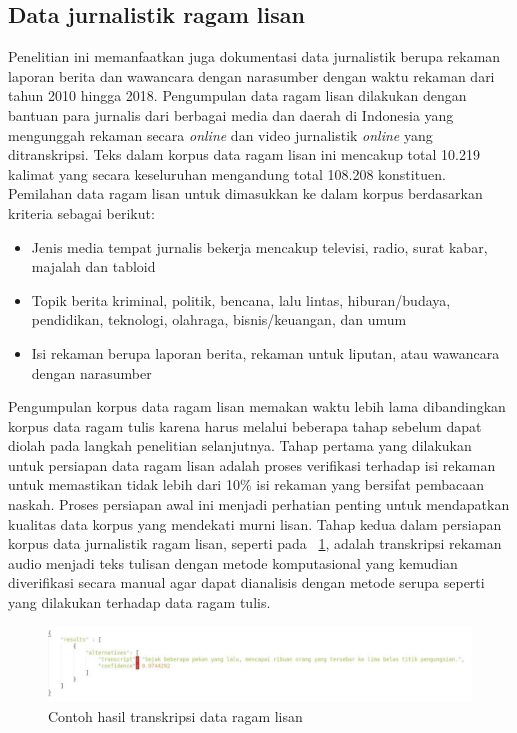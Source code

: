 \subsection{Data jurnalistik ragam lisan}
Penelitian ini memanfaatkan juga dokumentasi data jurnalistik berupa rekaman laporan berita dan wawancara dengan narasumber dengan waktu rekaman dari tahun 2010 hingga 2018. Pengumpulan data ragam lisan dilakukan dengan bantuan para jurnalis dari berbagai media dan daerah di Indonesia yang mengunggah rekaman secara \textit{online} dan video jurnalistik \textit{online} yang ditranskripsi. Teks dalam korpus data ragam lisan ini mencakup total 10.219 kalimat yang secara keseluruhan mengandung total 108.208 konstituen. Pemilahan data ragam lisan untuk dimasukkan ke dalam korpus berdasarkan kriteria sebagai berikut:

\begin{itemize}
	\item Jenis media tempat jurnalis bekerja mencakup televisi, radio, surat kabar, majalah dan tabloid
	\item Topik berita kriminal, politik, bencana, lalu lintas, hiburan/budaya, pendidikan, teknologi, olahraga, bisnis/keuangan, dan umum
	\item Isi rekaman berupa laporan berita, rekaman untuk liputan, atau wawancara dengan narasumber
\end{itemize}

Pengumpulan korpus data ragam lisan memakan waktu lebih lama dibandingkan korpus data ragam tulis karena harus melalui beberapa tahap sebelum dapat diolah pada langkah penelitian selanjutnya. Tahap pertama yang dilakukan untuk persiapan data ragam lisan adalah proses verifikasi terhadap isi rekaman untuk memastikan tidak lebih dari 10\% isi rekaman yang bersifat pembacaan naskah. Proses persiapan awal ini menjadi perhatian penting untuk mendapatkan kualitas data korpus yang mendekati murni lisan. Tahap kedua dalam persiapan korpus data jurnalistik ragam lisan, seperti pada \pic~\ref{fig:contoh-transkripsi-lisan}, adalah transkripsi rekaman audio menjadi teks tulisan dengan metode komputasional yang kemudian diverifikasi secara manual agar dapat dianalisis dengan metode serupa seperti yang dilakukan terhadap data ragam tulis. 

\begin{figure}
	\centering \includegraphics[width=1
	\textwidth] {pics/contoh-transkripsi-lisan.png} 
	\caption{Contoh hasil transkripsi data ragam lisan} 
	\label{fig:contoh-transkripsi-lisan} 
\end{figure}

